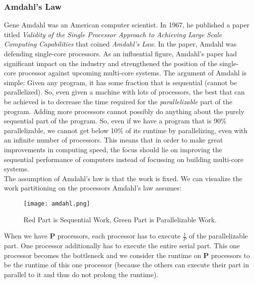 \documentclass[main.tex]{subfiles}
\begin{document}

\subsubsection{Amdahl's Law} \label{Amdahl's Law}
Gene Amdahl was an American computer scientist. In 1967, he published a paper titled \textit{Validity of the Single Processor Approach to Achieving Large Scale Computing Capabilities} that coined \textit{Amdahl's Law}. In the paper, Amdahl was defending single-core processors. As an influential figure, Amdahl's paper had significant impact on the industry and strengthened the position of the single-core processor against upcoming multi-core systems. The argument of Amdahl is simple: Given any program, it has some fraction that is sequential (cannot be parallelized). So, even given a machine with lots of processors, the best that can be achieved is to decrease the time required for the \textit{parallelizable} part of the program. Adding more processors cannot possibly do anything about the purely sequential part of the program. So, even if we have a program that is 90\% parallelizable, we cannot get below 10\% of its runtime by parallelizing, even with an infinite number of processors. This means that in order to make great improvements in computing speed, the focus should lie on improving the sequential performance of computers instead of focussing on building multi-core systems.\\
The assumption of Amdahl's law is that the work is fixed. We can visualize the work partitioning on the processors Amdahl's law assumes:

\begin{figure}[H]
    \centering
    \texttt{[image: amdahl.png]}
    \caption{Red Part is Sequential Work, Green Part is Parallelizable Work.}
\end{figure}

\noindent When we have \textbf{P} processors, each processor has to execute \(\frac{1}{P}\) of the parallelizable part. One processor additionally has to execute the entire serial part. This one processor becomes the bottleneck and we consider the runtime on \textbf{P} processors to be the runtime of this one processor (because the others can execute their part in parallel to it and thus do not prolong the runtime).
\end{document}
